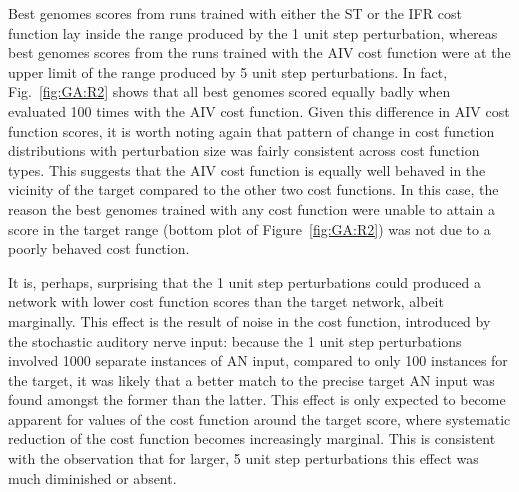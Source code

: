 
\smallskip{}

Best genomes scores from {\GA} runs trained with either the ST or the IFR cost
function lay inside the range produced by the 1 unit step perturbation, whereas
best genomes scores from the {\GA} runs trained with the AIV cost function were
at the upper limit of the range produced by 5 unit step perturbations. In fact,
Fig.~\ref{fig:GA:R2} shows that all best genomes scored equally badly when
evaluated 100 times with the AIV cost function. Given this difference in AIV
cost function scores, it is worth noting again that pattern of change in cost
function distributions with perturbation size was fairly consistent across cost
function types. This suggests that the AIV cost function is equally well behaved
in the vicinity of the target compared to the other two cost functions. In this
case, the reason the best genomes trained with any cost function were unable to
attain a score in the target range (bottom plot of Figure~\ref{fig:GA:R2}) was
not due to a poorly behaved cost function. 


\smallskip{}

It is, perhaps, surprising that the 1 unit step perturbations could produced a
network with lower cost function scores than the target network, albeit
marginally. This effect is the result of noise in the cost function, introduced
by the stochastic auditory nerve input: because the 1 unit step perturbations
involved 1000 separate instances of AN input, compared to only 100 instances for
the target, it was likely that a better match to the precise target AN input was
found amongst the former than the latter.  This effect is only expected to
become apparent for values of the cost function around the target score, where
systematic reduction of the cost function becomes increasingly marginal. This is
consistent with the observation that for larger, 5 unit step perturbations this
effect was much diminished or absent.



